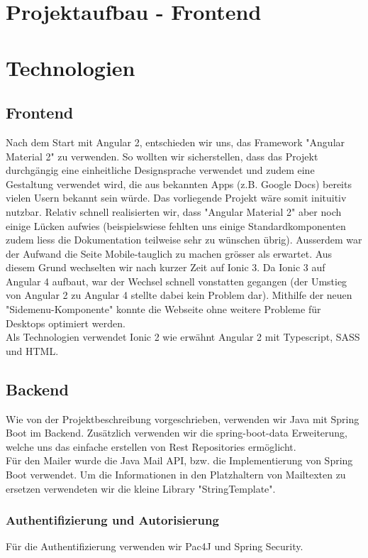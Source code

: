 \documentclass[11pt]{article} %
\begin{document}
\newpage
\section{Projektaufbau - Frontend}

\newpage
\section{Technologien}

\subsection{Frontend}
Nach dem Start mit Angular 2, entschieden wir uns, das Framework "Angular Material 2" zu verwenden. So wollten wir sicherstellen, dass das Projekt durchgängig eine einheitliche Designsprache verwendet und zudem eine Gestaltung verwendet wird, die aus bekannten Apps (z.B. Google Docs) bereits vielen Usern bekannt sein würde. Das vorliegende Projekt wäre somit inituitiv nutzbar. Relativ schnell realisierten wir, dass "Angular Material 2" aber noch einige Lücken aufwies (beispielswiese fehlten uns einige Standardkomponenten zudem liess die Dokumentation teilweise sehr zu wünschen übrig). Ausserdem war der Aufwand die Seite Mobile-tauglich zu machen grösser als erwartet. Aus diesem Grund wechselten wir nach kurzer Zeit auf Ionic 3. Da Ionic 3 auf Angular 4 aufbaut, war der Wechsel schnell vonstatten gegangen (der Umstieg von Angular 2 zu Angular 4 stellte dabei kein Problem dar). Mithilfe der neuen "Sidemenu-Komponente" konnte die Webseite ohne weitere Probleme für Desktops optimiert werden.
\\
Als Technologien verwendet Ionic 2 wie erwähnt Angular 2 mit Typescript, SASS und HTML.

\subsection{Backend}
Wie von der Projektbeschreibung vorgeschrieben, verwenden wir Java mit Spring Boot im Backend. Zusätzlich verwenden wir die spring-boot-data Erweiterung, welche uns das einfache erstellen von Rest Repositories ermöglicht.
\\
Für den Mailer wurde die Java Mail API, bzw. die Implementierung von Spring Boot verwendet. Um die Informationen in den Platzhaltern von Mailtexten zu ersetzen verwendeten wir die kleine Library "StringTemplate".

\subsubsection{Authentifizierung und Autorisierung}
Für die Authentifizierung verwenden wir Pac4J und Spring Security. 
\end{document}
